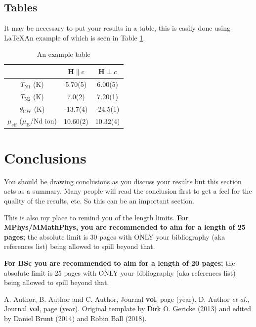 \documentclass[a4paper, twocolumn, 12pt, notitlepage]{revtex4-1}
\begin{document}
\subsection{Tables}
It may be necessary to put your results in a table, this is easily done using \LaTeX\. An example of which is seen in Table \ref{tab: tab_1}.

\begin{table}
\begin{tabular}{ c c c }
\hline 
 & $\mathbf{H} \parallel c$ & $\mathbf{H} \perp c$ \\ 
\hline 
$T_{\mathrm{N1}}$ (K) & 5.70(5) &  6.00(5) \\ 
$T_{\mathrm{N2}}$ (K) & 7.0(2) & 7.20(1) \\  
$\theta_{\mathrm{CW}}$ (K) & -13.7(4) & -24.5(1) \\  
$\mu_{\mathrm{eff}}$ ($\mu_{\mathrm{B}}$/Nd ion) & 10.60(2) & 10.32(4)  \\ 
\hline 
\end{tabular}
\caption{An example table}
\label{tab: tab_1}
\end{table} 


\section{Conclusions}
You should be drawing conclusions as you discuss your results but this section acts as a summary. Many people will read the conclusion first to get a feel for the quality of the results, etc. So this can be an important section. 

This is also my place to remind you of the length limits.  {\bf For MPhys/MMathPhys, you are recommended to aim for a length of 25 pages;}  the absolute limit is 30 pages with ONLY your bibliography (aka references list) being allowed to spill beyond that. 

{\bf For BSc you are recommended to aim for a length of 20 pages;} the absolute limit is 25 pages with ONLY your bibliography (aka references list) being allowed to spill beyond that.


\begin{thebibliography}{99}

\setlength{\itemsep}{-2mm}

 A. Author, B. Author and C. Author,
                  Journal {\bf vol}, page (year).
 D. Author {\em et al.},
                  Journal {\bf vol}, page (year).
 Original template by Dirk O. Gericke (2013) and edited by Daniel Brunt (2014) and Robin Ball (2018). 
\end{thebibliography}
\end{document}
